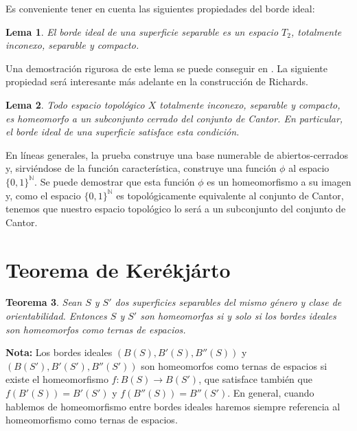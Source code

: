 \documentclass[a4paper,11pt,spanish, twoside, leqno]{tfg-uam}
\newtheorem{teor}{Teorema}[chapter]
\newtheorem{lema}[teor]{Lema}
\theoremstyle{definition}
\begin{document}
Es conveniente tener en cuenta las siguientes propiedades del borde ideal:

\begin{lema}
\label{lema:bordeidealcantor}
El borde ideal de una superficie separable es un espacio $T_2$, totalmente inconexo, separable y compacto. 
\end{lema}
Una demostración rigurosa de este lema se puede conseguir en \cite{Ahlfors}. La siguiente propiedad será interesante más adelante en la construcción de Richards.

\begin{lema}
\label{lema:bordeidealcantor2}
Todo espacio topológico $X$ totalmente inconexo, separable y compacto, es homeomorfo a un subconjunto cerrado del conjunto de Cantor. En particular, el borde ideal de una superficie satisface esta condición.
\end{lema}

En líneas generales, la prueba construye una base numerable de abiertos-cerrados y, sirviéndose de la función característica, construye una función $\phi$ al espacio $\{0,1\}^\mathbb{N}$. Se puede demostrar que esta función $\phi$ es un homeomorfismo a su imagen y, como el espacio $\{0,1\}^\mathbb{N}$ es topológicamente equivalente al conjunto de Cantor, tenemos que nuestro espacio topológico lo será a un subconjunto del conjunto de Cantor.

\section{Teorema de Kerékjárto}
\begin{teor}
\label{teor:kerekjarto}
Sean $S$ y $S'$ dos superficies separables del mismo género y clase de orientabilidad. Entonces $S$ y $S'$ son homeomorfas si y solo si los bordes ideales son homeomorfos como ternas de espacios.
\end{teor}
\noindent \textbf{Nota:} Los bordes ideales $(B(S), B'(S), B''(S))$ y $(B(S'), B'(S'), B''(S'))$ son homeomorfos como ternas de espacios si existe el homeomorfismo $f: B(S) \rightarrow B(S')$, que satisface también que $f(B'(S)) = B'(S') $ y $f(B''(S)) = B''(S')$. En general, cuando hablemos de homeomorfismo entre bordes ideales haremos siempre referencia al homeomorfismo como ternas de espacios.
\end{document}
